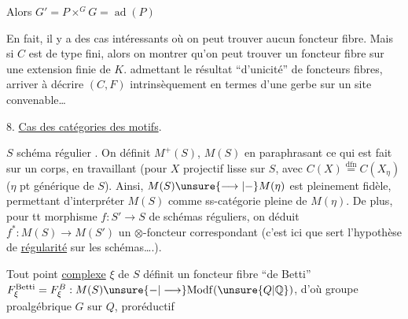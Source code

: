 Alors $G'=P\times^G G=\operatorname{ad}(P)$

En fait, il y a des cas intéressants où  on peut trouver aucun foncteur fibre. Mais si $C$ est de type fini, alors on  montrer qu'on peut trouver un foncteur fibre sur une extension finie de $K$.   admettant le résultat ``d'unicité'' de foncteurs fibres,  arriver à décrire $(C,F)$ intrinsèquement en termes d'une gerbe sur un site convenable\ldots

8. \uline{Cas des catégories des motifs}. 

$S$ schéma régulier . On définit $M^+(S)$, $M(S)$ en paraphrasant ce qui est fait sur un corps, en travaillant (pour $X$ projectif lisse sur $S$, avec $C(X)\overset{\mathrm{dfn}}=C(X_\eta)$ ($\eta$ pt générique de $S$). Ainsi, $M(S)\unsure{\longrightarrow|-}M(\eta)$ est pleinement fidèle, permettant d'interpréter $M(S)$ comme ss-catégorie pleine de $M(\eta)$. De plus, pour tt morphisme $f:S'\longrightarrow S$ de schémas réguliers, on déduit $f^*:M(S)\longrightarrow M(S')$ un $\otimes$-foncteur correspondant (c'est ici que sert l'hypothèse de \uline{régularité} sur les schémas\ldots.).

Tout point  \uline{complexe} $\xi$ de $S$ définit un foncteur fibre ``de Betti''  $F^{\mathrm{Betti}}_\xi=F^B_\xi:M(S)\unsure{-|\longrightarrow}\mathrm{Modf}(\unsure{Q|\mathbb Q})$, d'où  groupe proalgébrique $G$ sur $Q$, proréductif

